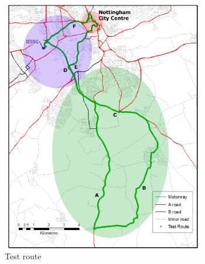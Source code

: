 \documentclass[11pt,fleqn]{book} %
\begin{document}
\begin{figure}[!htb]
\centering\includegraphics[clip,height=11cm]{pic/TrajectoryLayout}%
\caption{Test route \label{fig:Van-trajectory}}
\end{figure}
\end{document}
